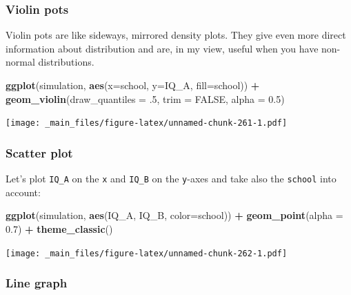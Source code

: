 \documentclass[
]{scrartcl}
\newenvironment{Shaded}{\begin{snugshade}}{\end{snugshade}}
\newcommand{\AttributeTok}[1]{\textcolor[rgb]{0.13,0.29,0.53}{#1}}
\newcommand{\ConstantTok}[1]{\textcolor[rgb]{0.56,0.35,0.01}{#1}}
\newcommand{\DecValTok}[1]{\textcolor[rgb]{0.00,0.00,0.81}{#1}}
\newcommand{\FloatTok}[1]{\textcolor[rgb]{0.00,0.00,0.81}{#1}}
\newcommand{\FunctionTok}[1]{\textcolor[rgb]{0.13,0.29,0.53}{\textbf{#1}}}
\newcommand{\NormalTok}[1]{#1}
\newcommand{\SpecialCharTok}[1]{\textcolor[rgb]{0.81,0.36,0.00}{\textbf{#1}}}
\begin{document}
\subsubsection{Violin pots}\label{violin-pots}

Violin pots are like sideways, mirrored density plots. They give even more direct information about distribution and are, in my view, useful when you have non-normal distributions.

\begin{Shaded}
\begin{Highlighting}[]
\FunctionTok{ggplot}\NormalTok{(simulation, }\FunctionTok{aes}\NormalTok{(}\AttributeTok{x=}\NormalTok{school, }\AttributeTok{y=}\NormalTok{IQ\_A, }\AttributeTok{fill=}\NormalTok{school)) }\SpecialCharTok{+}
    \FunctionTok{geom\_violin}\NormalTok{(}\AttributeTok{draw\_quantiles =}\NormalTok{ .}\DecValTok{5}\NormalTok{, }\AttributeTok{trim =} \ConstantTok{FALSE}\NormalTok{, }\AttributeTok{alpha =} \FloatTok{0.5}\NormalTok{)}
\end{Highlighting}
\end{Shaded}

\texttt{[image: \_main\_files/figure-latex/unnamed-chunk-261-1.pdf]}

\subsubsection{Scatter plot}\label{scatter-plot}

Let's plot \texttt{IQ\_A} on the \texttt{x} and \texttt{IQ\_B} on the \texttt{y}-axes and take also the \texttt{school} into account:

\begin{Shaded}
\begin{Highlighting}[]
\FunctionTok{ggplot}\NormalTok{(simulation, }\FunctionTok{aes}\NormalTok{(IQ\_A, IQ\_B, }\AttributeTok{color=}\NormalTok{school)) }\SpecialCharTok{+}
  \FunctionTok{geom\_point}\NormalTok{(}\AttributeTok{alpha =} \FloatTok{0.7}\NormalTok{) }\SpecialCharTok{+}
  \FunctionTok{theme\_classic}\NormalTok{()}
\end{Highlighting}
\end{Shaded}

\texttt{[image: \_main\_files/figure-latex/unnamed-chunk-262-1.pdf]}

\subsubsection{Line graph}\label{line-graph}
\end{document}
